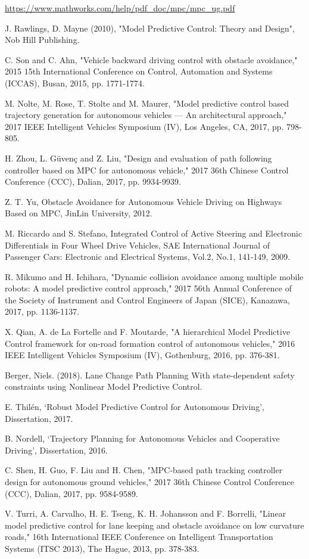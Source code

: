 \documentclass[conference, 11pt]{IEEEtran}
\begin{document}
\begin{thebibliography}{00}
		\url{https://www.mathworks.com/help/pdf_doc/mpc/mpc_ug.pdf}
		
	J. Rawlings, D. Mayne (2010), "Model Predictive Control: Theory and Design", Nob Hill Publishing.	
	
	C. Son and C. Ahn, "Vehicle backward driving control with obstacle avoidance," 2015 15th International Conference on Control, Automation and Systems (ICCAS), Busan, 2015, pp. 1771-1774.
	
	M. Nolte, M. Rose, T. Stolte and M. Maurer, "Model predictive control based trajectory generation for autonomous vehicles — An architectural approach," 2017 IEEE Intelligent Vehicles Symposium (IV), Los Angeles, CA, 2017, pp. 798-805.
	
	H. Zhou, L. Güvenç and Z. Liu, "Design and evaluation of path following controller based on MPC for autonomous vehicle," 2017 36th Chinese Control Conference (CCC), Dalian, 2017, pp. 9934-9939.
	
	 Z. T. Yu, Obstacle Avoidance for Autonomous Vehicle Driving on Highways Based on MPC, JinLin University, 2012.
	
	M. Riccardo and S. Stefano, Integrated Control of Active Steering and Electronic Differentials in Four Wheel Drive Vehicles,
	SAE International Journal of Passenger Cars: Electronic and Electrical Systems, Vol.2, No.1, 141-149, 2009.
	
	R. Mikumo and H. Ichihara, "Dynamic collision avoidance among multiple mobile robots: A model predictive control approach," 2017 56th Annual Conference of the Society of Instrument and Control Engineers of Japan (SICE), Kanazawa, 2017, pp. 1136-1137.
	
	X. Qian, A. de La Fortelle and F. Moutarde, "A hierarchical Model Predictive Control framework for on-road formation control of autonomous vehicles," 2016 IEEE Intelligent Vehicles Symposium (IV), Gothenburg, 2016, pp. 376-381.
	
	Berger, Niels. (2018). Lane Change Path Planning With state-dependent safety constraints using Nonlinear Model Predictive Control.
	
	E. Thilén, ‘Robust Model Predictive Control for Autonomous Driving’, Dissertation, 2017.
	
	B. Nordell, ‘Trajectory Planning for Autonomous Vehicles and Cooperative Driving’, Dissertation, 2016.
	
	C. Shen, H. Guo, F. Liu and H. Chen, "MPC-based path tracking controller design for autonomous ground vehicles," 2017 36th Chinese Control Conference (CCC), Dalian, 2017, pp. 9584-9589.
	
	V. Turri, A. Carvalho, H. E. Tseng, K. H. Johansson and F. Borrelli, "Linear model predictive control for lane keeping and obstacle avoidance on low curvature roads," 16th International IEEE Conference on Intelligent Transportation Systems (ITSC 2013), The Hague, 2013, pp. 378-383.
\end{thebibliography}
\end{document}
